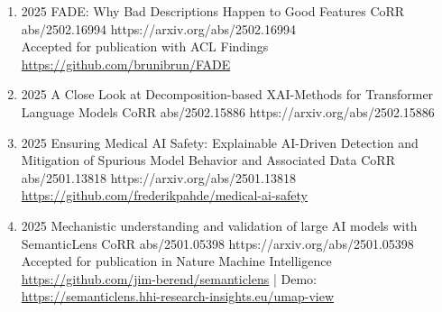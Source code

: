 {\begin{enumerate}
        
        \item {}
                        {2025}
                        {FADE: Why Bad Descriptions Happen to Good Features}
                        {CoRR abs/2502.16994}
                        {https://arxiv.org/abs/2502.16994}
                        {
                            \\Accepted for publication with ACL Findings
                            \\\href{https://github.com/brunibrun/FADE}{https://github.com/brunibrun/FADE}
                        }
                        
                        
        \item {}
                        {2025}
                        {A Close Look at Decomposition-based XAI-Methods for Transformer Language Models}
                        {CoRR abs/2502.15886}
                        {https://arxiv.org/abs/2502.15886}

       
        \item {}
                        {2025}
                        {Ensuring Medical AI Safety: Explainable AI-Driven Detection and Mitigation of Spurious Model Behavior and Associated Data}
                        {CoRR abs/2501.13818}
                        {https://arxiv.org/abs/2501.13818}
                        {
                            \\\href{https://github.com/frederikpahde/medical-ai-safety}{https://github.com/frederikpahde/medical-ai-safety}
                        }

        \item {}
                        {2025}
                        {Mechanistic understanding and validation of large AI models with SemanticLens}
                        {CoRR abs/2501.05398}
                        {https://arxiv.org/abs/2501.05398}
                        {   
                            \\ Accepted for publication in Nature Machine Intelligence
                            \\\href{https://github.com/jim-berend/semanticlens}{https://github.com/jim-berend/semanticlens} | Demo: \href{https://semanticlens.hhi-research-insights.eu/umap-view}{https://semanticlens.hhi-research-insights.eu/umap-view}
                        }


\end{enumerate}}
